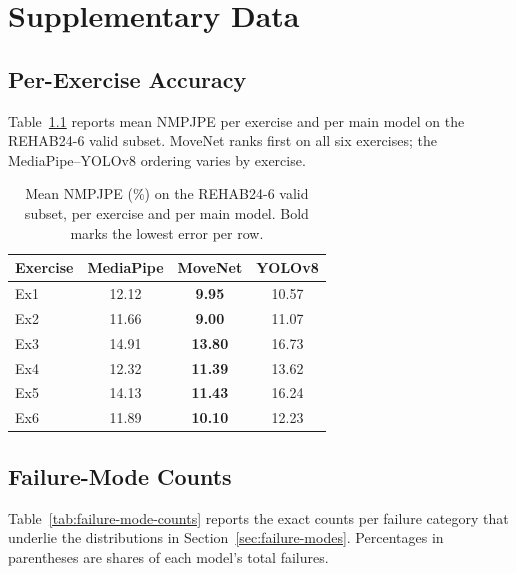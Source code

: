 \chapter{Supplementary Data}
\label{app:supplementary}

\section{Per-Exercise Accuracy}
\label{app:per-exercise}

Table~\ref{tab:per-exercise-nmpjpe} reports mean NMPJPE per exercise and per main model on the REHAB24-6 valid subset. MoveNet ranks first on all six exercises; the MediaPipe--YOLOv8 ordering varies by exercise.

\begin{table}[htbp]
  \centering
  \caption{Mean NMPJPE (\%) on the REHAB24-6 valid subset, per exercise and per main model. Bold marks the lowest error per row.}
  \label{tab:per-exercise-nmpjpe}
  \begin{tabular}{lccc}
    \toprule
    Exercise & MediaPipe & MoveNet & YOLOv8 \\
    \midrule
    Ex1 & 12.12 & \textbf{9.95}  & 10.57 \\
    Ex2 & 11.66 & \textbf{9.00}  & 11.07 \\
    Ex3 & 14.91 & \textbf{13.80} & 16.73 \\
    Ex4 & 12.32 & \textbf{11.39} & 13.62 \\
    Ex5 & 14.13 & \textbf{11.43} & 16.24 \\
    Ex6 & 11.89 & \textbf{10.10} & 12.23 \\
    \bottomrule
  \end{tabular}
\end{table}

\section{Failure-Mode Counts}
\label{app:failure-mode-counts}

Table~\ref{tab:failure-mode-counts} reports the exact counts per failure category that underlie the distributions in Section~\ref{sec:failure-modes}. Percentages in parentheses are shares of each model's total failures.

